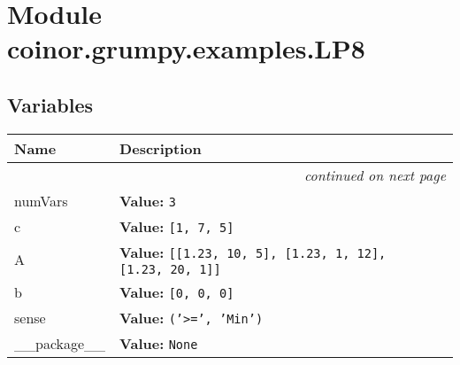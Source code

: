 %
%
%


\section{Module coinor.grumpy.examples.LP8}

    \label{coinor:grumpy:examples:LP8}


  \subsection{Variables}

    \vspace{-1cm}
\hspace{\varindent}\begin{longtable}{|p{\varnamewidth}|p{\vardescrwidth}|l}
\cline{1-2}
\cline{1-2} \centering \textbf{Name} & \centering \textbf{Description}& \\
\cline{1-2}
\endhead\cline{1-2}\multicolumn{3}{r}{\small\textit{continued on next page}}\\\endfoot\cline{1-2}
\endlastfoot\raggedright n\-u\-m\-V\-a\-r\-s\- & \raggedright \textbf{Value:} 
{\tt 3}&\\
\cline{1-2}
\raggedright c\- & \raggedright \textbf{Value:} 
{\tt \texttt{[}1\texttt{, }7\texttt{, }5\texttt{]}}&\\
\cline{1-2}
\raggedright A\- & \raggedright \textbf{Value:} 
{\tt \texttt{[}\texttt{[}1.23\texttt{, }10\texttt{, }5\texttt{]}\texttt{, }\texttt{[}1.23\texttt{, }1\texttt{, }12\texttt{]}\texttt{, }\texttt{[}1.23\texttt{, }20\texttt{, }1\texttt{]}\texttt{]}}&\\
\cline{1-2}
\raggedright b\- & \raggedright \textbf{Value:} 
{\tt \texttt{[}0\texttt{, }0\texttt{, }0\texttt{]}}&\\
\cline{1-2}
\raggedright s\-e\-n\-s\-e\- & \raggedright \textbf{Value:} 
{\tt \texttt{(}\texttt{'}\texttt{{\textgreater}=}\texttt{'}\texttt{, }\texttt{'}\texttt{Min}\texttt{'}\texttt{)}}&\\
\cline{1-2}
\raggedright \_\-\_\-p\-a\-c\-k\-a\-g\-e\-\_\-\_\- & \raggedright \textbf{Value:} 
{\tt None}&\\
\cline{1-2}
\end{longtable}

